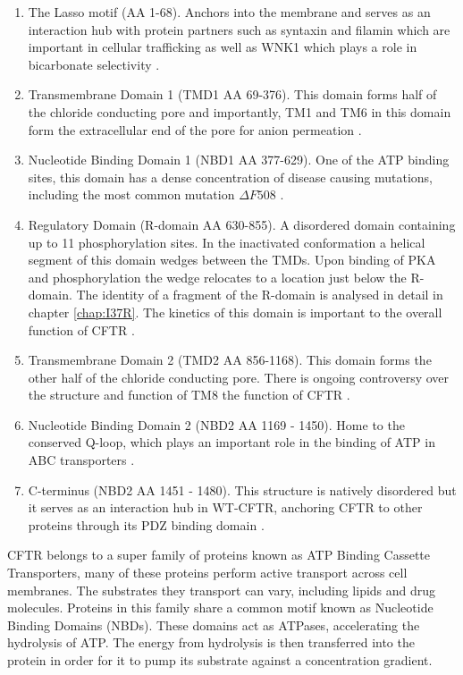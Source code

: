 \begin{enumerate}
	\item The Lasso motif (AA 1-68). Anchors into the membrane and serves as an interaction hub with protein partners such as syntaxin and filamin which are important in cellular trafficking \cite{cormet-boyaka2002, naren1998, thelin2007} as well as WNK1 which plays a role in bicarbonate selectivity \cite{kim2019}.
	\item Transmembrane Domain 1 (TMD1 AA 69-376). This domain forms half of the chloride conducting pore and importantly, TM1 and TM6 in this domain form the extracellular end of the pore for anion permeation \cite{linsdell2006, linsdell2022}.
	\item Nucleotide Binding Domain 1 (NBD1 AA 377-629). One of the ATP binding sites, this domain has a dense concentration of disease causing mutations, including the most common mutation $\Delta F508$ \cite{cftr2}.
	\item Regulatory Domain (R-domain AA 630-855). A disordered domain containing up to 11 phosphorylation sites\cite{mihalyi2020}. In the inactivated conformation a helical segment of this domain wedges between the TMDs. Upon binding of PKA and phosphorylation the wedge relocates to a location just below the R-domain. The identity of a fragment of the R-domain is analysed in detail in chapter \ref{chap:I37R}. The kinetics of this domain is important to the overall function of CFTR \cite{ostedgaard2000, mihalyi2020}. 
	\item Transmembrane Domain 2 (TMD2 AA 856-1168). This domain forms the other half of the chloride conducting pore. There is ongoing controversy over the structure and function of TM8 the function of CFTR \cite{hegedus2022, liu2019}.
	\item Nucleotide Binding Domain 2 (NBD2 AA 1169 - 1450). Home to the conserved Q-loop, which plays an important role in the binding of ATP in ABC transporters \cite{ivey2020, zolnerciks2014, dong2015}.
	\item C-terminus (NBD2 AA 1451 - 1480). This structure is natively disordered but it serves as an interaction hub in WT-CFTR, anchoring CFTR to other proteins through its PDZ binding domain \cite{moyer1999, cushing2008}. 

\end{enumerate}

CFTR belongs to a super family of proteins known as ATP Binding Cassette Transporters,  many of these proteins perform active transport across cell membranes. The substrates they transport can vary, including lipids and drug molecules. Proteins in this family share a common motif known as Nucleotide Binding Domains (NBDs). These domains act as ATPases, accelerating the hydrolysis of ATP. The energy from hydrolysis is then transferred into the protein in order for it to pump its substrate against a concentration gradient. 


